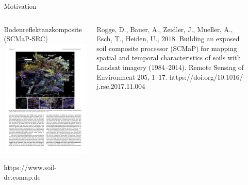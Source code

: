 \begin{frame}{Motivation}
\begin{columns}
 \column{8cm}
 \begin{block}{Bodenreflektanzkomposite (SCMaP-SRC)}
\centering\includegraphics[width=1\textwidth]{FIGURE/BareSoilIndex.pdf}

\tiny https://www.soil-de.eomap.de
\end{block}
 \column{3cm}

\raggedright\tiny Rogge, D., Bauer, A., Zeidler, J., Mueller, A., Esch, T., Heiden, U., 2018. Building an exposed soil composite processor (SCMaP) for mapping spatial and temporal characteristics of soils with Landsat imagery (1984–2014). Remote Sensing of Environment 205, 1–17. https://doi.org/10.1016/
j.rse.2017.11.004
\end{columns}
\end{frame}


